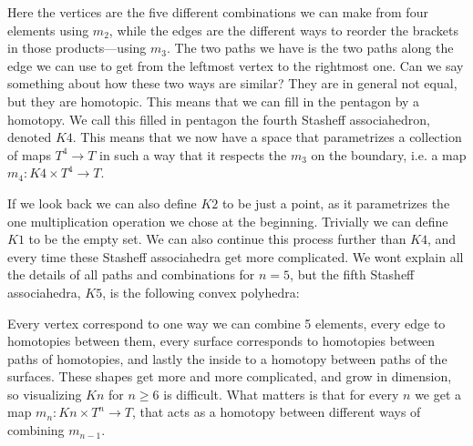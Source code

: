 Here the vertices are the five different combinations we can make from four elements using $m_2$, while the edges are the different ways to reorder the brackets in those products---using $m_3$. The two paths we have is the two paths along the edge we can use to get from the leftmost vertex to the rightmost one. Can we say something about how these two ways are similar? They are in general not equal, but they are homotopic. This means that we can fill in the pentagon by a homotopy. We call this filled in pentagon the fourth Stasheff associahedron, denoted $K4$. This means that we now have a space that parametrizes a collection of maps $T^4\longrightarrow T$ in such a way that it respects the $ m_3$ on the boundary, i.e. a map $m_4: K4\times T^4\longrightarrow T$.

 
If we look back we can also define $K2$ to be just a point, as it parametrizes the one multiplication operation we chose at the beginning. Trivially we can define $ K1$ to be the empty set. We can also continue this process further than $K4$, and every time these Stasheff associahedra get more complicated. We wont explain all the details of all paths and combinations for $n=5$, but the fifth Stasheff associahedra, $K5$, is the following convex polyhedra:

\begin{center}
\def\svgwidth{0.5\textwidth}

\end{center}

Every vertex correspond to one way we can combine 5 elements, every edge to homotopies between them, every surface corresponds to homotopies between paths of homotopies, and lastly the inside to a homotopy between paths of the surfaces. These shapes get more and more complicated, and grow in dimension, so visualizing $Kn$ for $n\geq 6$ is difficult. What matters is that for every $n$ we get a map $m_n:Kn\times T^n\longrightarrow T$, that acts as a homotopy between different ways of combining $m_{n-1}$.

 

